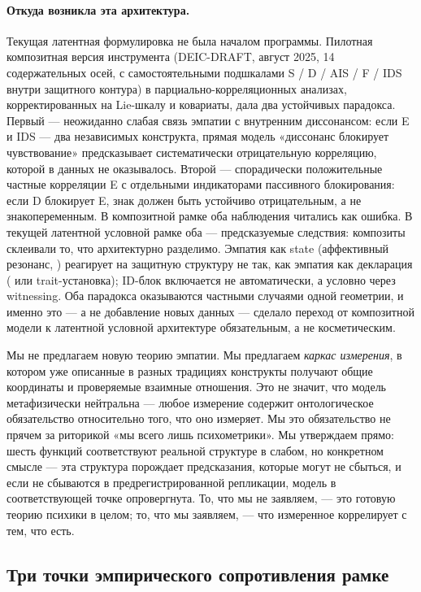 \paragraph{Откуда возникла эта архитектура.} Текущая латентная формулировка не была началом программы. Пилотная композитная версия инструмента (DEIC-DRAFT, август 2025, 14 содержательных осей, с самостоятельными подшкалами S / D / AIS / F / IDS внутри защитного контура) в парциально-корреляционных анализах, корректированных на Lie-шкалу и ковариаты, дала два устойчивых парадокса. Первый --- неожиданно слабая связь эмпатии с внутренним диссонансом: если E и IDS --- два независимых конструкта, прямая модель «диссонанс блокирует чувствование» предсказывает систематически отрицательную корреляцию, которой в данных не оказывалось. Второй --- спорадически положительные частные корреляции E с отдельными индикаторами пассивного блокирования: если D блокирует E, знак должен быть устойчиво отрицательным, а не знакопеременным. В композитной рамке оба наблюдения читались как ошибка. В текущей латентной условной рамке оба --- предсказуемые следствия: композиты склеивали то, что архитектурно разделимо. Эмпатия как state (аффективный резонанс, \EAF{}) реагирует на защитную структуру не так, как эмпатия как декларация (\Ecog{} или trait-установка); ID-блок включается не автоматически, а условно через witnessing. Оба парадокса оказываются частными случаями одной геометрии, и именно это --- а не добавление новых данных --- сделало переход от композитной модели к латентной условной архитектуре обязательным, а не косметическим.

Мы не предлагаем новую теорию эмпатии. Мы предлагаем \emph{каркас измерения}, в котором уже описанные в разных традициях конструкты получают общие координаты и проверяемые взаимные отношения. Это не значит, что модель метафизически нейтральна --- любое измерение содержит онтологическое обязательство относительно того, что оно измеряет. Мы это обязательство не прячем за риторикой «мы всего лишь психометрики». Мы утверждаем прямо: шесть функций \DEIC{} соответствуют реальной структуре в слабом, но конкретном смысле --- эта структура порождает предсказания, которые могут не сбыться, и если не сбываются в предрегистрированной репликации, модель в соответствующей точке опровергнута. То, что мы не заявляем, --- это готовую теорию психики в целом; то, что мы заявляем, --- что измеренное коррелирует с тем, что есть.

\subsection{Три точки эмпирического сопротивления рамке}
\label{subsec:data_resistance}


